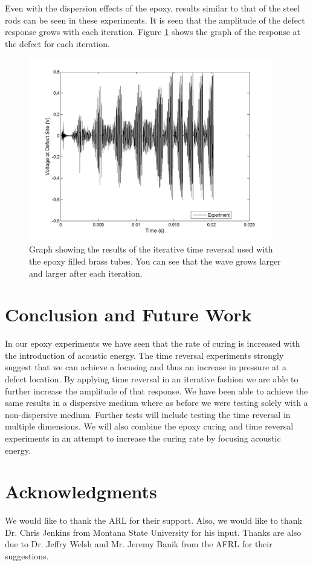 \documentclass[]{aiaa-tc}%
\begin{document}
Even with the dispersion effects of the epoxy, results similar to that of the steel rods can be seen in these experiments. It is seen that the amplitude of the defect response grows with each iteration. Figure \ref{fig:tr_epoxy1} shows the graph of the response at the defect for each iteration.

\begin{figure}[H]%
\centering
 \includegraphics[height = 8cm]{tr_epoxy1}
 \caption{Graph showing the results of the iterative time reversal used with the epoxy filled brass tubes. You can see that the wave grows larger and larger after each iteration.}
 \label{fig:tr_epoxy1}
\end{figure}


\section{Conclusion and Future Work}

In our epoxy experiments we have seen that the rate of curing is increased with the introduction of acoustic energy. The time reversal experiments strongly suggest that we can achieve a focusing and thus an increase in pressure at a defect location. By applying time reversal in an iterative fashion we are able to further increase the amplitude of that response. We have been able to achieve the same results in a dispersive medium where as before we were testing solely with a non-dispersive medium. Further tests will include testing the time reversal in multiple dimensions. We will also combine the epoxy curing and time reversal experiments in an attempt to increase the curing rate by focusing acoustic energy.

\section{Acknowledgments}

We would like to thank the ARL for their support. Also, we would like to thank Dr. Chris Jenkins from Montana State University for his input. Thanks are also due to Dr. Jeffry Welsh and Mr. Jeremy Banik from the AFRL for their suggestions.

{}

\end{document}
